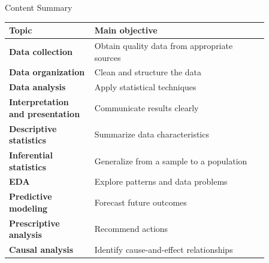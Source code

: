 \documentclass[aspectratio=169,11pt]{beamer}
\begin{document}
\begin{frame}[allowframebreaks]{Content Summary}
\small
\begin{center}\scriptsize
\begin{tabular}{@{}p{0.28\linewidth}p{0.58\linewidth}@{}}
\toprule
\textbf{Topic} & \textbf{Main objective}\\
\midrule
\textbf{Data collection} & Obtain quality data from appropriate sources\\
\textbf{Data organization} & Clean and structure the data\\
\textbf{Data analysis} & Apply statistical techniques\\
\textbf{Interpretation and presentation} & Communicate results clearly\\
\textbf{Descriptive statistics} & Summarize data characteristics\\
\textbf{Inferential statistics} & Generalize from a sample to a population\\
\textbf{EDA} & Explore patterns and data problems\\
\textbf{Predictive modeling} & Forecast future outcomes\\
\textbf{Prescriptive analysis} & Recommend actions\\
\textbf{Causal analysis} & Identify cause-and-effect relationships\\
\bottomrule
\end{tabular}
\end{center}
\end{frame}
\end{document}
